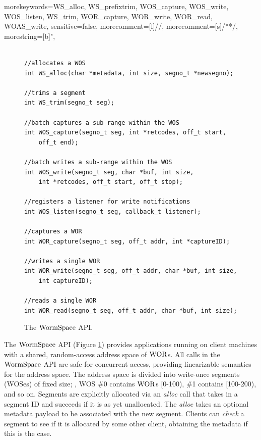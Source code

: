 {morekeywords={WS_alloc, WS_prefixtrim, WOS_capture, WOS_write, WOS_listen, WS_trim, WOR_capture, WOR_write, WOR_read, WOAS_write},
sensitive=false,
morecomment=[l]{//},
morecomment=[s]{/*}{*/},
morestring=[b]",
}
%

\begin{figure}

\begin{lstlisting}[language=rock]%, basicstyle=\linespread{0.5}]

//allocates a WOS
int WS_alloc(char *metadata, int size, segno_t *newsegno);

//trims a segment
int WS_trim(segno_t seg); 

//batch captures a sub-range within the WOS
int WOS_capture(segno_t seg, int *retcodes, off_t start,
    off_t end);

//batch writes a sub-range within the WOS
int WOS_write(segno_t seg, char *buf, int size,
    int *retcodes, off_t start, off_t stop);

//registers a listener for write notifications
int WOS_listen(segno_t seg, callback_t listener);

//captures a WOR
int WOR_capture(segno_t seg, off_t addr, int *captureID);

//writes a single WOR
int WOR_write(segno_t seg, off_t addr, char *buf, int size,
    int captureID);

//reads a single WOR
int WOR_read(segno_t seg, off_t addr, char *buf, int size);
\end{lstlisting}
\caption{The $\mathrm{WormSpace}$ API.}
\label{fig:chapter:multipaxos:api}
\end{figure}



The $\mathrm{WormSpace}$ API (Figure \ref{fig:chapter:multipaxos:api}) provides applications running on client machines with a shared, 
random-access address space of $\mathrm{WOR}$s. 
All calls in the $\mathrm{WormSpace}$ API are safe for concurrent access, providing linearizable semantics for the address space. 
The address space is divided into write-once segments (WOSes) of fixed size; 
\ie, WOS \#0 contains $\mathrm{WOR}$s [0-100), \#1 contains [100-200), and so on. 
Segments are explicitly allocated via an \textit{alloc} call that takes in a segment ID and succeeds if it is as yet unallocated. 
The \textit{alloc} takes an optional metadata payload to be associated with the new segment.
 Clients can \textit{check} a segment to see if it is allocated by some other client, obtaining the metadata if this is the case. 

